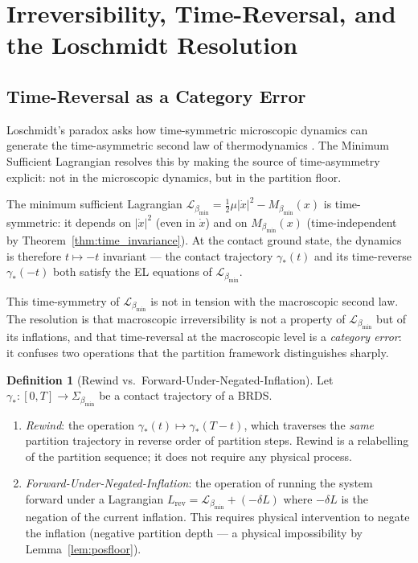 \documentclass[11pt,twocolumn,a4paper]{article}
\theoremstyle{plain}
\theoremstyle{definition}
\newtheorem{definition}[theorem]{Definition}
\theoremstyle{remark}
\newcommand{\bmin}{\beta_{\min}}
\newcommand{\Lmin}{\mathcal{L}_{\bmin}}
\newcommand{\half}{\tfrac{1}{2}}
\begin{document}
\section{Irreversibility, Time-Reversal, and the Loschmidt Resolution}
\label{sec:loschmidt}

\subsection{Time-Reversal as a Category Error}

Loschmidt's paradox asks how time-symmetric microscopic dynamics can generate
the time-asymmetric second law of thermodynamics \citep{boltzmann1896,zeh2007}.
The Minimum Sufficient Lagrangian resolves this by making the source of
time-asymmetry explicit: not in the microscopic dynamics, but in the partition
floor.

The minimum sufficient Lagrangian $\Lmin = \half\mu|\dot{x}|^2 - M_{\bmin}(x)$
is time-symmetric: it depends on $|\dot{x}|^2$ (even in $\dot{x}$) and on
$M_{\bmin}(x)$ (time-independent by Theorem~\ref{thm:time_invariance}). At the
contact ground state, the dynamics is therefore $t \mapsto -t$ invariant --- the
contact trajectory $\gamma_*(t)$ and its time-reverse $\gamma_*(-t)$ both
satisfy the EL equations of $\Lmin$.

This time-symmetry of $\Lmin$ is not in tension with the macroscopic second law.
The resolution is that macroscopic irreversibility is not a property of $\Lmin$
but of its inflations, and that time-reversal at the macroscopic level is a
\emph{category error}: it confuses two operations that the partition framework
distinguishes sharply.

\begin{definition}[Rewind vs.\ Forward-Under-Negated-Inflation]
\label{def:rewind}
Let $\gamma_*: [0, T] \to \Sigma_{\bmin}$ be a contact trajectory of a BRDS.
\begin{enumerate}[label=(\roman*)]
  \item \emph{Rewind}: the operation $\gamma_*(t) \mapsto \gamma_*(T - t)$,
  which traverses the \emph{same} partition trajectory in reverse order of
  partition steps. Rewind is a relabelling of the partition sequence; it does
  not require any physical process.
  \item \emph{Forward-Under-Negated-Inflation}: the operation of running the
  system forward under a Lagrangian $L_{\mathrm{rev}} = \Lmin + (-\delta L)$
  where $-\delta L$ is the negation of the current inflation. This requires
  physical intervention to negate the inflation (negative partition depth
  --- a physical impossibility by Lemma~\ref{lem:posfloor}).
\end{enumerate}
\end{definition}
\end{document}
